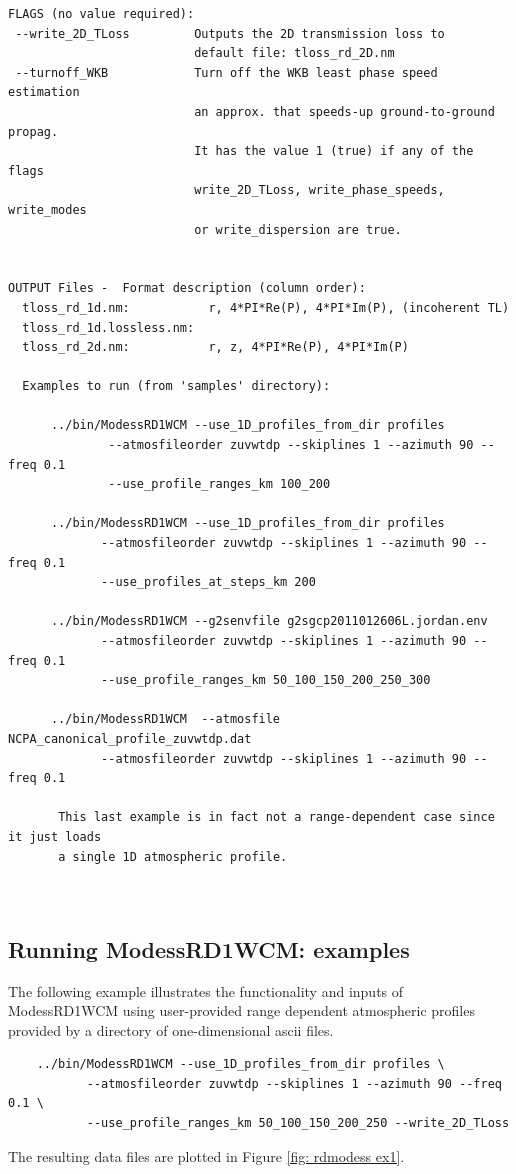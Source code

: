 \begin{verbatim}
FLAGS (no value required):
 --write_2D_TLoss         Outputs the 2D transmission loss to
                          default file: tloss_rd_2D.nm
 --turnoff_WKB            Turn off the WKB least phase speed estimation
                          an approx. that speeds-up ground-to-ground propag.
                          It has the value 1 (true) if any of the flags
                          write_2D_TLoss, write_phase_speeds, write_modes
                          or write_dispersion are true.


OUTPUT Files -  Format description (column order):
  tloss_rd_1d.nm:           r, 4*PI*Re(P), 4*PI*Im(P), (incoherent TL)
  tloss_rd_1d.lossless.nm:
  tloss_rd_2d.nm:           r, z, 4*PI*Re(P), 4*PI*Im(P)

  Examples to run (from 'samples' directory):

      ../bin/ModessRD1WCM --use_1D_profiles_from_dir profiles 
              --atmosfileorder zuvwtdp --skiplines 1 --azimuth 90 --freq 0.1 
              --use_profile_ranges_km 100_200

      ../bin/ModessRD1WCM --use_1D_profiles_from_dir profiles 
             --atmosfileorder zuvwtdp --skiplines 1 --azimuth 90 --freq 0.1 
             --use_profiles_at_steps_km 200

      ../bin/ModessRD1WCM --g2senvfile g2sgcp2011012606L.jordan.env 
             --atmosfileorder zuvwtdp --skiplines 1 --azimuth 90 --freq 0.1 
             --use_profile_ranges_km 50_100_150_200_250_300

      ../bin/ModessRD1WCM  --atmosfile NCPA_canonical_profile_zuvwtdp.dat 
             --atmosfileorder zuvwtdp --skiplines 1 --azimuth 90 --freq 0.1

       This last example is in fact not a range-dependent case since it just loads
       a single 1D atmospheric profile.

    
\end{verbatim}

\subsection{Running ModessRD1WCM: examples}
\label{sec: rdmodess examples}

The following example illustrates the functionality and inputs of ModessRD1WCM using user-provided range dependent atmospheric profiles provided by a directory of one-dimensional ascii files. 
\begin{verbatim}
    ../bin/ModessRD1WCM --use_1D_profiles_from_dir profiles \
           --atmosfileorder zuvwtdp --skiplines 1 --azimuth 90 --freq 0.1 \
           --use_profile_ranges_km 50_100_150_200_250 --write_2D_TLoss
\end{verbatim}
The resulting data files are plotted in Figure \ref{fig: rdmodess ex1}. 


